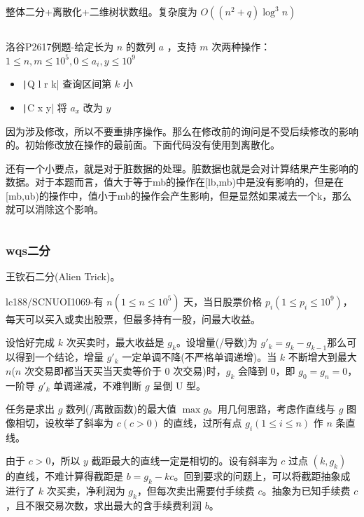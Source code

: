 \documentclass[twocolumn,10pt]{ctexart}
\begin{document}
整体二分+离散化+二维树状数组。复杂度为 $O((n^2+q)\log^3n)$

\inputminted{cpp}{code/p1527_parallel_binsearch.cpp}

\begin{notebox}
洛谷P2617例题-给定长为 $n$ 的数列 $a$ ，支持 $m$ 次两种操作：$1\le n,\allowbreak{}m\le10^5,\allowbreak{}0\le a_i,\allowbreak{}y\le10^9$

\begin{itemize}
\item \texttt|Q l r k| 查询区间第 $k$ 小
\item \texttt|C x y| 将 $a_x$ 改为 $y$
\end{itemize}
\end{notebox}

因为涉及修改，所以不要重排序操作。那么在修改前的询问是不受后续修改的影响的。初始修改放在操作的最前面。下面代码没有使用到离散化。

还有一个小要点，就是对于脏数据的处理。脏数据也就是会对计算结果产生影响的数据。对于本题而言，值大于等于mb的操作在[lb,mb)中是没有影响的，但是在[mb,ub)的操作中，值小于mb的操作会产生影响，但是显然如果减去一个k，那么就可以消除这个影响。

\inputminted{cpp}{code/ext_069.cpp}

\subsubsection{wqs二分}

王钦石二分(Alien Trick)。

\begin{notebox}
lc188/SCNUOI1069-有 $n(1\le n\le10^5)$ 天，当日股票价格 $p_i(1\le p_i\le 10^9)$，每天可以买入或卖出股票，但最多持有一股，问最大收益。
\end{notebox}

设恰好完成 $k$ 次买卖时，最大收益是 $g_k$。设增量(/导数)为 $g'_k=g_k-g_{k-1}$那么可以得到一个结论，增量 $g'_k$ 一定单调不降(不严格单调递增)。当 $k$ 不断增大到最大 $n$($n$ 次交易即都当天买当天卖等价于 $0$ 次交易)时，$g_k$ 会降到 $0$，即 $g_0=g_n=0$，一阶导 $g'_k$ 单调递减，不难判断 $g$ 呈倒 U 型。

任务是求出 $g$ 数列(/离散函数)的最大值 $\max g$。用几何思路，考虑作直线与 $g$ 图像相切，设枚举了斜率为 $c(c > 0)$ 的直线，过所有点 $g_i(1\le i\le n)$ 作 $n$ 条直线。

由于 $c > 0$，所以 $y$ 截距最大的直线一定是相切的。设有斜率为 $c$ 过点 $(k,g_k)$ 的直线，不难计算得截距是 $b=g_k-kc$。回到要求的问题上，可以将截距抽象成进行了 $k$ 次买卖，净利润为 $g_k$，但每次卖出需要付手续费 $c$。抽象为已知手续费 $c$，且不限交易次数，求出最大的含手续费利润 $b$。
\end{document}
